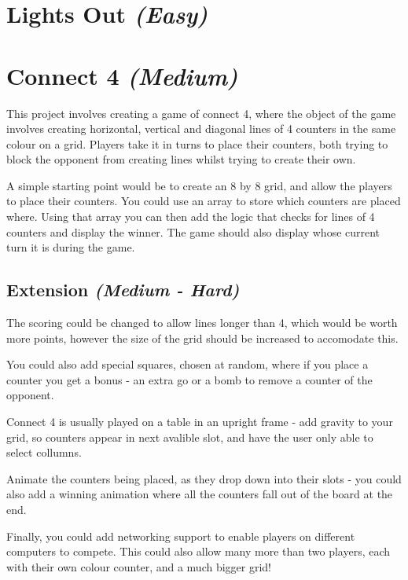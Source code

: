 \documentclass[12pt,a4paper,twoside]{article}
\renewcommand{\_}{\texttt{\symbol{95}}}
\begin{document}
\newpage
\section{Lights Out \it{(Easy)}}


\newpage
\section{Connect 4 \it{(Medium)}}

This project involves creating a game of connect 4, where the object of the game
involves creating horizontal, vertical and diagonal lines of 4 counters in the
same colour on a grid. Players take it in turns to place their counters, both
trying to block the opponent from creating lines whilst trying to create their
own.

A simple starting point would be to create an 8 by 8 grid, and allow the players
to place their counters. You could use an array to store which counters are placed
where. Using that array you can then add the logic that checks for lines of 4
counters and display the winner. The game should also display whose current turn 
it is during the game.

\subsection{Extension \it{(Medium - Hard)}}

The scoring could be changed to allow lines longer than 4, which would be worth 
more points, however the size of the grid should be increased to accomodate this.

You could also add special squares, chosen at random, where if you place a counter
you get a bonus - an extra go or a bomb to remove a counter of the opponent.

Connect 4 is usually played on a table in an upright frame - add gravity to your
grid, so counters appear in next avalible slot, and have the user only able to
select collumns.

Animate the counters being placed, as they drop down into their slots - you could
also add a winning animation where all the counters fall out of the board at the
end.

Finally, you could add networking support to enable players on different computers
to compete. This could also allow many more than two players, each with their own 
colour counter, and a much bigger grid!

%
\end{document}

